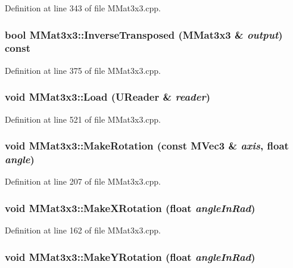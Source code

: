 Definition at line 343 of file MMat3x3.cpp.\hypertarget{class_m_mat3x3_b2aa137135d4743f57910a2958eacd2b}{
\subsubsection[{InverseTransposed}]{\setlength{\rightskip}{0pt plus 5cm}bool MMat3x3::InverseTransposed ({\bf MMat3x3} \& {\em output}) const}}
\label{class_m_mat3x3_b2aa137135d4743f57910a2958eacd2b}




Definition at line 375 of file MMat3x3.cpp.\hypertarget{class_m_mat3x3_00cd1ab58183f2bacce2e2e38ac77363}{
\subsubsection[{Load}]{\setlength{\rightskip}{0pt plus 5cm}void MMat3x3::Load ({\bf UReader} \& {\em reader})}}
\label{class_m_mat3x3_00cd1ab58183f2bacce2e2e38ac77363}




Definition at line 521 of file MMat3x3.cpp.\hypertarget{class_m_mat3x3_1513b85723e4ab41feb71d56db6aa625}{
\subsubsection[{MakeRotation}]{\setlength{\rightskip}{0pt plus 5cm}void MMat3x3::MakeRotation (const {\bf MVec3} \& {\em axis}, \/  float {\em angle})}}
\label{class_m_mat3x3_1513b85723e4ab41feb71d56db6aa625}




Definition at line 207 of file MMat3x3.cpp.\hypertarget{class_m_mat3x3_bd1bb896aeeaf05ec76624c5e996818b}{
\subsubsection[{MakeXRotation}]{\setlength{\rightskip}{0pt plus 5cm}void MMat3x3::MakeXRotation (float {\em angleInRad})}}
\label{class_m_mat3x3_bd1bb896aeeaf05ec76624c5e996818b}




Definition at line 162 of file MMat3x3.cpp.\hypertarget{class_m_mat3x3_772a24dfb662f3348eaf19c5e57b578b}{
\subsubsection[{MakeYRotation}]{\setlength{\rightskip}{0pt plus 5cm}void MMat3x3::MakeYRotation (float {\em angleInRad})}}
\label{class_m_mat3x3_772a24dfb662f3348eaf19c5e57b578b}




